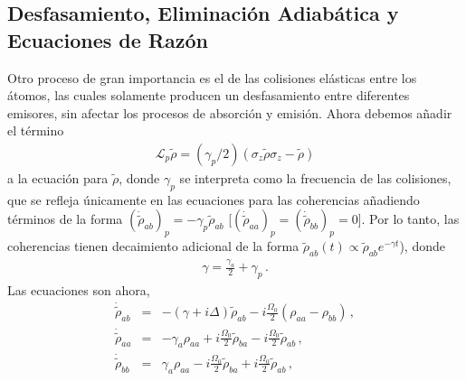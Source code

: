 \documentclass[twocolumn,aps,eqsecnum]{revtex4}
\begin{document}
\subsection{Desfasamiento, Eliminaci\'on Adiab\'atica y Ecuaciones 
de Raz\'on} 
Otro proceso de gran importancia es el de las colisiones el\'asticas entre 
los \'atomos, las cuales solamente producen un desfasamiento entre 
diferentes emisores, sin afectar los procesos de absorci\'on y emisi\'on. 
Ahora debemos a\~nadir el t\'ermino 
%
\begin{eqnarray}
\mathcal{L}_p \tilde{\rho} = 
	 (\gamma_p /2) (\sigma_z \tilde{\rho} \sigma_z -\tilde{\rho}) 
\end{eqnarray}
a la ecuaci\'on para $\tilde{\rho}$, donde $\gamma_p$ se interpreta como 
la frecuencia de las colisiones, que se refleja \'unicamente en las 
ecuaciones para las coherencias a\~nadiendo t\'erminos de la forma 
$(\dot{{\tilde{\rho}}}_{ab})_p = -\gamma_p \tilde{\rho}_{ab}$ 
[$(\dot{{\tilde{\rho}}}_{aa})_p = (\dot{{\tilde{\rho}}}_{bb})_p = 0$]. 
Por lo tanto, las coherencias tienen decaimiento adicional de la forma 
$\tilde{\rho}_{ab} (t) \propto \tilde{\rho}_{ab} e^{- \gamma t}$), donde  
%
\begin{eqnarray}
\gamma = \frac{\gamma_a}{2} +\gamma_p  \,. 
\end{eqnarray}
Las ecuaciones son ahora, 
%
\begin{eqnarray} 	%
\dot{\tilde{\rho}}_{ab} 
	&=& - \left( \gamma +i\Delta \right) \tilde{\rho}_{ab}
	-i\frac{\Omega_0}{2} (\rho_{aa} -\rho_{bb}) 	\,, \nonumber \\ 
\dot{\tilde{\rho}}_{aa} 
	&=& -\gamma_a \rho_{aa} + i\frac{\Omega_0}{2} \tilde{\rho}_{ba} 
	- i\frac{\Omega_0}{2} \tilde{\rho}_{ab} 	\,, 	\nonumber \\ 
\dot{\tilde{\rho}}_{bb} 
	&=& \gamma_a \rho_{aa} - i\frac{\Omega_0}{2} \tilde{\rho}_{ba} 
	+ i\frac{\Omega_0}{2} \tilde{\rho}_{ab} 	\,,
\end{eqnarray}
\end{document}
